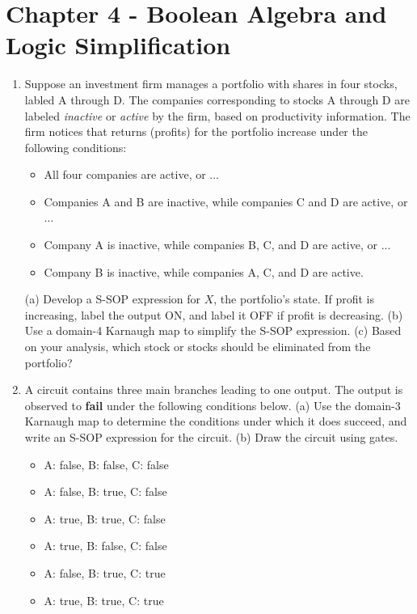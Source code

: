 \documentclass[10pt]{article}
\begin{document}
\section{Chapter 4 - Boolean Algebra and Logic Simplification}

\begin{enumerate}
\item Suppose an investment firm manages a portfolio with shares in four stocks, labled A through D.  The companies corresponding to stocks A through D are labeled \textit{inactive} or \textit{active} by the firm, based on productivity information.  The firm notices that returns (profits) for the portfolio increase under the following conditions:
\begin{itemize}
\item All four companies are active, or ...
\item Companies A and B are inactive, while companies C and D are active, or ...
\item Company A is inactive, while companies B, C, and D are active, or ...
\item Company B is inactive, while companies A, C, and D are active.
\end{itemize}
(a) Develop a S-SOP expression for $X$, the portfolio's state.  If profit is increasing, label the output ON, and label it OFF if profit is decreasing. (b) Use a domain-4 Karnaugh map to simplify the S-SOP expression. (c) Based on your analysis, which stock or stocks should be eliminated from the portfolio?  \\ \vspace{2.5cm}
\item A circuit contains three main branches leading to one output.  The output is observed to \textbf{fail} under the following conditions below.  (a) Use the domain-3 Karnaugh map to determine the conditions under which it does succeed, and write an S-SOP expression for the circuit. (b) Draw the circuit using gates.
\begin{itemize}
\item A: false, B: false, C: false
\item A: false, B: true, C: false
\item A: true, B: true, C: false
\item A: true, B: false, C: false
\item A: false, B: true, C: true
\item A: true, B: true, C: true
\end{itemize}
\end{enumerate}
\end{document}
